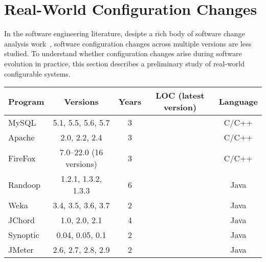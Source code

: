 \section{Real-World Configuration Changes}
\label{sec:study}

In the software engineering literature, desipte a rich body of
software change analysis work~\cite{}, 
software configuration changes across multiple
versions are less studied. To understand whether configuration
changes arise during software evolution in practice,
this section describes a preliminary study of
\studysubjnum  real-world configurable systems.



\begin{table}[t]
\vspace{1mm}
\centering
\small{
\setlength{\tabcolsep}{.40\tabcolsep}
\begin{tabular}{|l||c|c|c|c|}
\hline
 Program & Versions & Years & LOC (latest version)  & Language\\
 \hline
 \hline
 MySQL & 5.1, 5.5, 5.6, 5.7 & 3 && C/C++\\
 Apache& 2.0, 2.2, 2.4 & 3  & &C/C++\\
 FireFox& 7.0--22.0 (16 versions) & 3  & &C/C++\\
 Randoop & 1.2.1, 1.3.2, 1.3.3 & 6 &    &Java\\
 Weka & 3.4, 3.5, 3.6, 3.7  & 2  &  &Java\\
 JChord & 1.0, 2.0, 2.1 &  4 &   &Java\\
 Synoptic & 0.04, 0.05, 0.1 & 2   & &Java\\
 JMeter & 2.6, 2.7, 2.8, 2.9& 2   & &Java\\
\hline
\end{tabular}
}
\vspace{-2mm}
\end{table}


